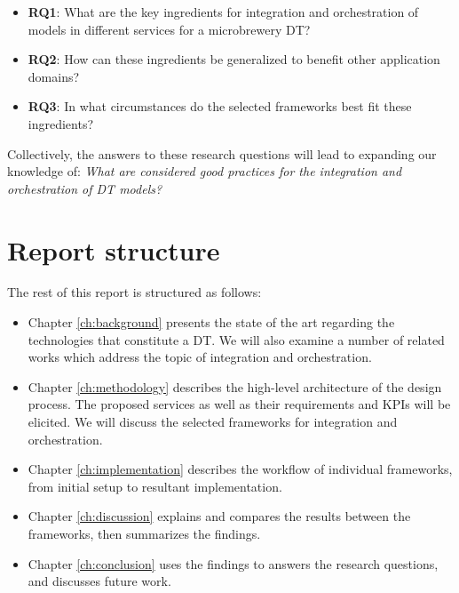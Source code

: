 \begin{itemize}

  \item \textbf{RQ1}: What are the key ingredients for integration and orchestration of models in different services for a microbrewery DT?
  \item \textbf{RQ2}: How can these ingredients be generalized to benefit other application domains? 
  \item \textbf{RQ3}: In what circumstances do the selected frameworks best fit these ingredients?  
  
\end{itemize}

Collectively, the answers to these research questions will lead to expanding our knowledge of: \textit{What are considered good practices for the integration and orchestration of DT models?}

\section{Report structure}
The rest of this report is structured as follows: 

\begin{itemize}

\item Chapter \ref{ch:background} presents the state of the art regarding the technologies that constitute a DT. We will also examine a number of related works which address the topic of integration and orchestration.

\item Chapter \ref{ch:methodology} describes the high-level architecture of the design process. The proposed services as well as their requirements and KPIs will be elicited. We will discuss the selected frameworks for integration and orchestration.

\item Chapter \ref{ch:implementation} describes the workflow of individual frameworks, from initial setup to resultant implementation.

\item Chapter \ref{ch:discussion} explains and compares the results between the frameworks, then summarizes the findings.

\item Chapter \ref{ch:conclusion} uses the findings to answers the research questions, and discusses future work.

\end{itemize}


